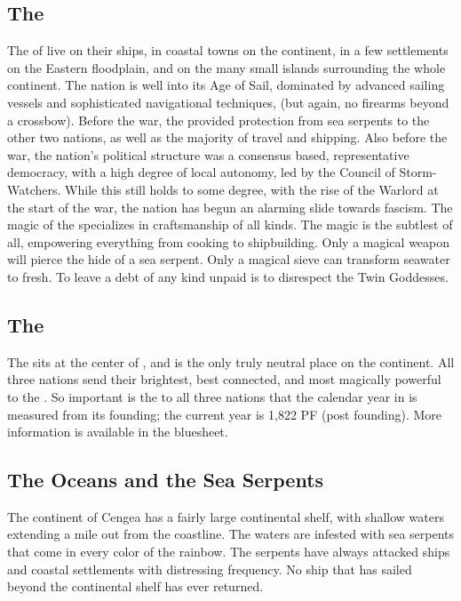 \documentclass[blue]{GL2020}
\begin{document}
\subsection*{The \pShip{}}
The \pShippies{} of \pShip{} live on their ships, in coastal towns on the continent, in a few settlements on the Eastern floodplain, and on the many small islands surrounding the whole continent. The nation is well into its Age of Sail, dominated by advanced sailing vessels and sophisticated navigational techniques, (but again, no firearms beyond a crossbow). Before the war, the \pShippies{} provided protection from sea serpents to the other two nations, as well as the majority of travel and shipping. Also before the war, the nation's political structure was a consensus based, representative democracy, with a high degree of local autonomy, led by the Council of Storm-Watchers. While this still holds to some degree, with the rise of the Warlord \cLoud{\full} at the start of the war, the nation has begun an alarming slide towards fascism. The magic of the \pShippies{} specializes in craftsmanship of all kinds. The \pShip{} magic is the subtlest of all, empowering everything from cooking to shipbuilding. Only a magical weapon will pierce the hide of a sea serpent. Only a magical sieve can transform seawater to fresh. To leave a debt of any kind unpaid is to disrespect the Twin Goddesses.

\subsection*{The \pSchool{}}
The \pSchool{} sits at the center of \pEarth{}, and is the only truly neutral place on the continent. All three nations send their brightest, best connected, and most magically powerful to the \pSc{}. So important is the \pSchool{} to all three nations that the calendar year in \pEarth{} is measured from its founding; the current year is 1,822 PF (post founding). More information is available in the \pSchool{} bluesheet.

\subsection*{The Oceans and the Sea Serpents}
The continent of Cengea has a fairly large continental shelf, with shallow waters extending a mile out from the coastline. The waters are infested with sea serpents that come in every color of the rainbow. The serpents have always attacked ships and coastal settlements with distressing frequency. No ship that has sailed beyond the continental shelf has ever returned.
\end{document}
